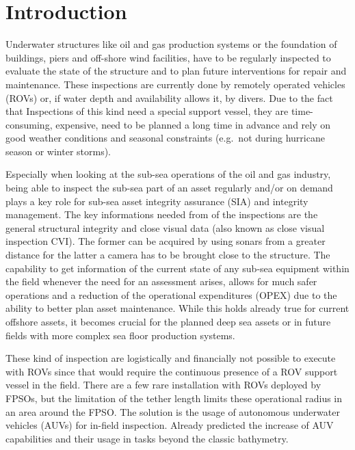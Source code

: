 \documentclass[conference]{IEEEtran}
\begin{document}
\IEEEpeerreviewmaketitle

\section{Introduction}

Underwater structures like oil and gas production systems or the foundation of buildings,
piers and off-shore wind facilities, have to be regularly inspected to evaluate the state
of the structure and to plan future interventions for repair and maintenance. These
inspections are currently done by remotely operated vehicles (ROVs) or, if water depth and
availability allows it, by divers. Due to the fact that Inspections of this kind need a
special support vessel, they are time-consuming, expensive, need to be planned a long time
in advance and rely on good weather conditions and seasonal constraints (e.g.~not during
hurricane season or winter storms).

Especially when looking at the sub-sea operations of the oil and gas industry, being able
to inspect the sub-sea part of an asset regularly and/or on demand plays a key role for
sub-sea asset integrity assurance (SIA) and integrity management. The key informations
needed from of the inspections are the general structural integrity and close visual data
(also known as close visual inspection CVI). The former can be acquired by using sonars
from a greater distance for the latter a camera has to be brought close to the structure.
The capability to get information of the current state of any sub-sea equipment within the
field whenever the need for an assessment arises, allows for much safer operations and a
reduction of the operational expenditures (OPEX) due to the ability to better plan asset
maintenance. While this holds already true for current offshore assets, it becomes crucial
for the planned deep sea assets or in future fields with more complex sea floor production
systems.

These kind of inspection are logistically and financially not possible to execute with
ROVs since that would require the continuous presence of a ROV support vessel in the
field. There are a few rare installation with ROVs deployed by FPSOs, but the limitation
of the tether length limits these operational radius in an area around the FPSO. The
solution is the usage of autonomous underwater vehicles (AUVs) for in-field inspection.
Already \cite{gamechanger07} predicted the increase of AUV capabilities and their usage in
tasks beyond the classic bathymetry.
\end{document}
